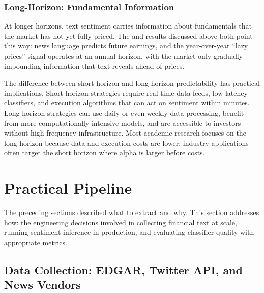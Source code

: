 \subsubsection*{Long-Horizon: Fundamental Information}

At longer horizons, text sentiment carries information about fundamentals that the market has not yet fully priced. The \citet{tetlock2008words} and \citet{cohen2020lazy} results discussed above both point this way: news language predicts future earnings, and the year-over-year ``lazy prices'' signal operates at an annual horizon, with the market only gradually impounding information that text reveals ahead of prices.

\begin{remark}
The difference between short-horizon and long-horizon predictability has practical implications. Short-horizon strategies require real-time data feeds, low-latency classifiers, and execution algorithms that can act on sentiment within minutes. Long-horizon strategies can use daily or even weekly data processing, benefit from more computationally intensive models, and are accessible to investors without high-frequency infrastructure. Most academic research focuses on the long horizon because data and execution costs are lower; industry applications often target the short horizon where alpha is larger before costs.
\end{remark}

\section{Practical Pipeline}
\label{sec:ch09-practical-pipeline}

\begin{context}

The preceding sections described what to extract and why. This section addresses how: the engineering decisions involved in collecting financial text at scale, running sentiment inference in production, and evaluating classifier quality with appropriate metrics.

\end{context}

\subsection{Data Collection: EDGAR, Twitter API, and News Vendors}
\label{sec:ch09-data-collection}

